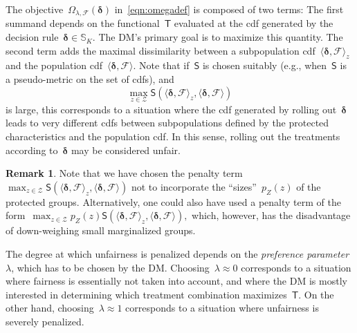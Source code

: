 \documentclass[11pt, a4paper]{article}
\theoremstyle{definition}
\newtheorem{remark}{Remark}[section]
\begin{document}
The objective~$\Omega_{\lambda, \mathcal{F}}(\bm{\delta})$ in~\eqref{eqn:omegadef} is composed of two terms: The first summand depends on the functional~$\mathsf{T}$ evaluated at the cdf generated by the decision rule~$\bm{\delta} \in \mathbb{S}_K$. The DM's primary goal is to maximize this quantity. The second term adds the maximal dissimilarity between a subpopulation cdf~$ \langle \bm{\delta}, \mathcal{F} \rangle_z$ and the population cdf~$\langle \bm{\delta}, \mathcal{F} \rangle$. Note that if~$\mathsf{S}$ is chosen suitably (e.g., when~$\mathsf{S}$ is a pseudo-metric on the set of cdfs), and~$$\max_{z \in \mathcal{Z}} \mathsf{S} \left(\langle \bm{\delta}, \mathcal{F} \rangle_z , \langle \bm{\delta}, \mathcal{F} \rangle \right)$$ is large, this corresponds to a situation where the cdf generated by rolling out~$\bm{\delta}$ leads to very different cdfs between subpopulations defined by the protected characteristics and the population cdf. In this sense, rolling out the treatments according to~$\bm{\delta}$ may be considered unfair. 

\begin{remark}\label{rem:groupsize}
Note that we have chosen the penalty term~$\max_{z \in \mathcal{Z}} \mathsf{S} \left(\langle \bm{\delta}, \mathcal{F} \rangle_z , \langle \bm{\delta}, \mathcal{F} \rangle \right)$ not to incorporate the ``sizes''~$p_Z(z)$ of the protected groups. Alternatively, one could also have used a penalty term of the form~$\max_{z \in \mathcal{Z}} p_Z(z)\mathsf{S} \left(\langle \bm{\delta}, \mathcal{F} \rangle_z , \langle \bm{\delta}, \mathcal{F} \rangle \right),$ which, however, has the disadvantage of down-weighing small marginalized groups.  
\end{remark}

The degree at which unfairness is penalized depends on the \emph{preference parameter}~$\lambda$, which has to be chosen by the DM. Choosing~$\lambda \approx 0$ corresponds to a situation where fairness is essentially not taken into account, and where the DM is mostly interested in determining which treatment combination maximizes~$\mathsf{T}$. On the other hand, choosing~$\lambda \approx 1$ corresponds to a situation where unfairness is severely penalized. 
\end{document}

